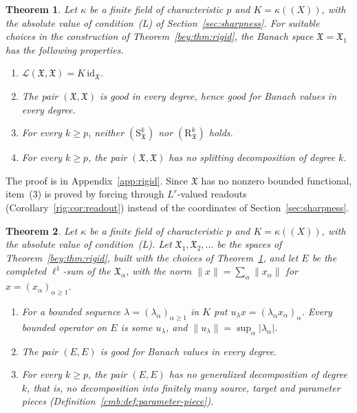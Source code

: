\documentclass[11pt]{amsart}
\newtheorem{theorem}{Theorem}[section]
\theoremstyle{definition}
\theoremstyle{remark}
\numberwithin{equation}{section}
\newcommand{\cL}{\mathcal L}
\newcommand{\id}{\mathrm{id}}
\newcommand{\abs}[1]{\lvert #1\rvert}
\newcommand{\norm}[1]{\lVert #1\rVert}
\theoremstyle{plain}
\theoremstyle{definition}
\theoremstyle{plain}
\newcommand{\fX}{\mathfrak X}
\begin{document}
\begin{theorem}\label{bey:thm:rigid-good}
Let $\kappa$ be a finite field of characteristic $p$ and $K=\kappa((X))$, with the absolute value of condition~(L) of
Section~\ref{sec:sharpness}. For suitable choices in the construction of Theorem~\ref{bey:thm:rigid}, the Banach space
$\fX=\fX_1$ has the following properties.
\begin{enumerate}
\item $\cL(\fX,\fX)=K\,\id_{\fX}$.
\item The pair $(\fX,\fX)$ is good in every degree, hence good for Banach values in every degree.
\item For every $k\ge p$, neither $(\mathrm S^k_{\fX})$ nor $(\mathrm R^k_{\fX})$ holds.
\item For every $k\ge p$, the pair $(\fX,\fX)$ has no splitting decomposition of degree $k$.
\end{enumerate}
\end{theorem}

The proof is in Appendix~\ref{app:rigid}. Since $\fX$ has no nonzero bounded functional, item~(3) is proved by
forcing through $L^r$-valued readouts (Corollary~\ref{rig:cor:readout}) instead of the coordinates of
Section~\ref{sec:sharpness}.

\begin{theorem}\label{bey:thm:rigid-sum}
Let $\kappa$ be a finite field of characteristic $p$ and $K=\kappa((X))$, with the absolute value of condition~(L).
Let $\fX_1,\fX_2,\dots$ be the spaces of Theorem~\ref{bey:thm:rigid}, built with the choices of
Theorem~\ref{bey:thm:rigid-good}, and let $E$ be the completed $\ell^1$-sum of the $\fX_\alpha$, with the norm
$\norm x=\sum_\alpha\norm{x_\alpha}$ for $x=(x_\alpha)_{\alpha\ge1}$.
\begin{enumerate}
\item For a bounded sequence $\lambda=(\lambda_\alpha)_{\alpha\ge1}$ in $K$ put $u_\lambda x=(\lambda_\alpha x_\alpha)_\alpha$.
Every bounded operator on $E$ is some $u_\lambda$, and $\norm{u_\lambda}=\sup_\alpha\abs{\lambda_\alpha}$.
\item The pair $(E,E)$ is good for Banach values in every degree.
\item For every $k\ge p$, the pair $(E,E)$ has no generalized decomposition of degree $k$, that is, no decomposition
into finitely many source, target and parameter pieces (Definition~\ref{cmb:def:parameter-piece}).
\end{enumerate}
\end{theorem}
\end{document}
